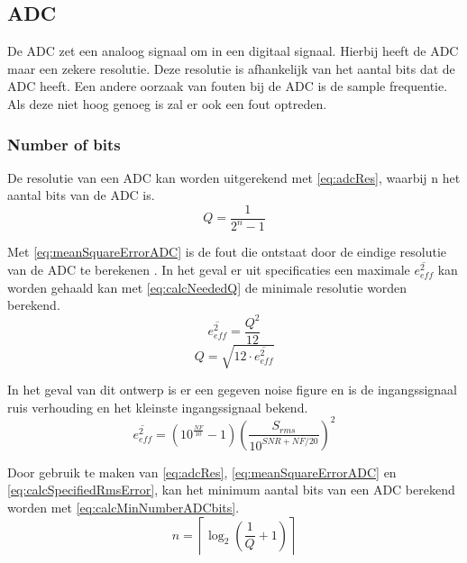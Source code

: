 \subsection{ADC}

De ADC zet een analoog signaal om in een digitaal signaal. Hierbij heeft de ADC maar een zekere resolutie. Deze resolutie is afhankelijk van het aantal bits dat de ADC heeft. Een andere oorzaak van fouten bij de ADC is de sample frequentie. Als deze niet hoog genoeg is zal er ook een fout optreden.

\subsubsection{Number of bits} \label{sec:ADC:numBits}
De resolutie van een ADC kan worden uitgerekend met \cref{eq:adcRes}, waarbij n het aantal bits van de ADC is.
\begin{equation}\label{eq:adcRes}
    Q=\frac{1}{2^n-1}
\end{equation}

Met \cref{eq:meanSquareErrorADC} is de fout die ontstaat door de eindige resolutie van de ADC te berekenen \cite{MJHcalcADC}. In het geval er uit specificaties een maximale $\overline{e_{eff}^2}$ kan worden gehaald kan met \cref{eq:calcNeededQ} de minimale resolutie worden berekend.
\begin{equation}\label{eq:meanSquareErrorADC} 
    \overline{e_{eff}^2}=\frac{Q^2}{12}
\end{equation}
\begin{equation}\label{eq:calcNeededQ}
    Q=\sqrt{12\cdot\overline{e_{eff}^2}}
\end{equation}

In het geval van dit ontwerp is er een gegeven noise figure en is de ingangssignaal ruis verhouding en het kleinste ingangssignaal bekend. %
\begin{equation}\label{eq:calcSpecifiedRmsError}
    \overline{e_{eff}^2}=\left(10^{\frac{NF}{10}}-1\right)\left(\frac{S_{rms}}{10^{SNR+NF/20}}\right)^2
\end{equation}

Door gebruik te maken van \cref{eq:adcRes}, \cref{eq:meanSquareErrorADC} en \cref{eq:calcSpecifiedRmsError}, kan het minimum aantal bits van een ADC berekend worden met \cref{eq:calcMinNumberADCbits}.
\begin{equation}\label{eq:calcMinNumberADCbits}
    n=\left\lceil\log_2\left(\frac{1}{Q}+1\right)\right\rceil
\end{equation}

